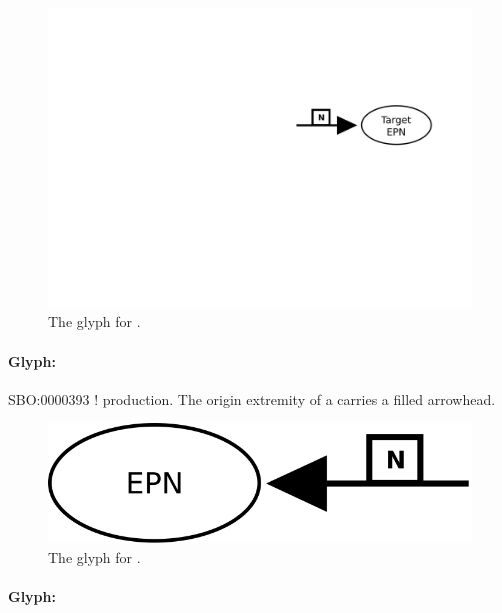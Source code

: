 \begin{figure}[H]
  \centering
  \includegraphics[scale = 0.4]{images/production}
  \caption{The \PD glyph for .}
  \label{fig:production}
\end{figure}

\paragraph{Glyph: }\label{sec:reversible}

\begin{glyphDescription}
 \glyphSboTerm SBO:0000393 ! production.
 \glyphEndPoint The origin extremity of a  carries a filled arrowhead.
 \end{glyphDescription}

\begin{figure}[H]
  \centering
  \includegraphics[scale = 0.4]{images/reversible}
  \caption{The \PD glyph for .}
  \label{fig:reversible}
\end{figure}


\paragraph{Glyph: }

